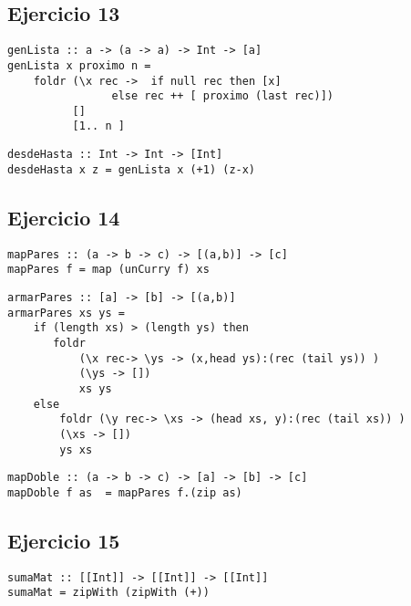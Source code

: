 \subsection{Ejercicio 13}
\begin{centrado}
	\begin{verbatim}
genLista :: a -> (a -> a) -> Int -> [a]
genLista x proximo n = 
    foldr (\x rec ->  if null rec then [x]
	            else rec ++ [ proximo (last rec)])
          []
          [1.. n ]
	\end{verbatim}
\end{centrado}

\begin{centrado}
	\begin{verbatim}
desdeHasta :: Int -> Int -> [Int]
desdeHasta x z = genLista x (+1) (z-x)
	\end{verbatim}
\end{centrado}

\subsection{Ejercicio 14}
\begin{centrado}
\begin{verbatim}
mapPares :: (a -> b -> c) -> [(a,b)] -> [c]
mapPares f = map (unCurry f) xs
\end{verbatim}
\end{centrado}
\begin{centrado}
	\begin{verbatim}
armarPares :: [a] -> [b] -> [(a,b)]
armarPares xs ys =
    if (length xs) > (length ys) then 
       foldr 
	       (\x rec-> \ys -> (x,head ys):(rec (tail ys)) )
           (\ys -> [])
           xs ys
    else 
		foldr (\y rec-> \xs -> (head xs, y):(rec (tail xs)) )
        (\xs -> [])
        ys xs
	\end{verbatim}
\end{centrado}

\begin{centrado}
\begin{verbatim}
mapDoble :: (a -> b -> c) -> [a] -> [b] -> [c]
mapDoble f as  = mapPares f.(zip as)
\end{verbatim}
\end{centrado}

	
\subsection{Ejercicio 15}
\begin{centrado}
\begin{verbatim}
sumaMat :: [[Int]] -> [[Int]] -> [[Int]]
sumaMat = zipWith (zipWith (+))
\end{verbatim}
\end{centrado}

